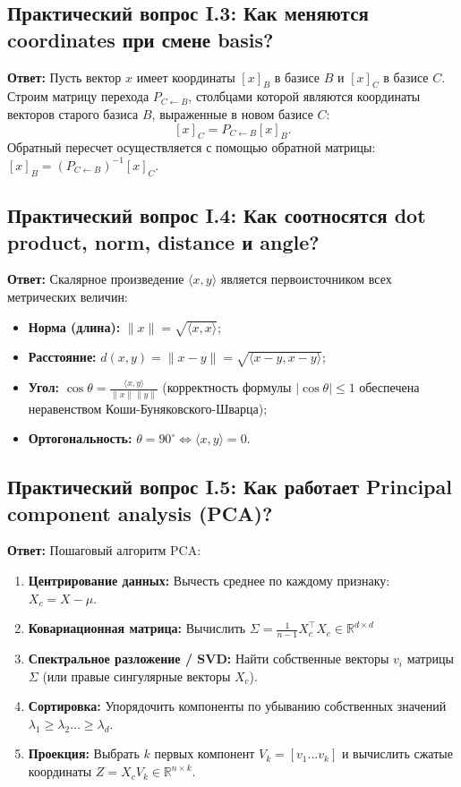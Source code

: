 \subsection{Практический вопрос I.3: Как меняются coordinates при смене basis?}
\textbf{Ответ:} Пусть вектор $x$ имеет координаты $[x]_B$ в базисе $B$ и $[x]_C$ в базисе $C$.
Строим матрицу перехода $P_{C \leftarrow B}$, столбцами которой являются координаты векторов старого базиса $B$,
выраженные в новом базисе $C$:
\[ [x]_C = P_{C \leftarrow B} [x]_B. \]
Обратный пересчет осуществляется с помощью обратной матрицы: $[x]_B = (P_{C \leftarrow B})^{-1} [x]_C$.

\subsection{Практический вопрос I.4: Как соотносятся dot product, norm, distance и angle?}
\textbf{Ответ:} Скалярное произведение $\langle x, y \rangle$ является первоисточником всех метрических величин:
\begin{itemize}
    \item \textbf{Норма (длина):} $\|x\| = \sqrt{\langle x, x \rangle}$;
    \item \textbf{Расстояние:} $d(x, y) = \|x - y\| = \sqrt{\langle x-y, x-y \rangle}$;
    \item \textbf{Угол:} $\cos \theta = \frac{\langle x, y \rangle}{\|x\| \|y\|}$ (корректность формулы
    $|\cos \theta| \le 1$ обеспечена неравенством Коши-Буняковского-Шварца);
    \item \textbf{Ортогональность:} $\theta = 90^\circ \iff \langle x, y \rangle = 0$.
\end{itemize}

\subsection{Практический вопрос I.5: Как работает Principal component analysis (PCA)?}
\textbf{Ответ:} Пошаговый алгоритм PCA:
\begin{enumerate}
    \item \textbf{Центрирование данных:} Вычесть среднее по каждому признаку: $X_c = X - \mu$.
    \item \textbf{Ковариационная матрица:} Вычислить $\Sigma=\frac{1}{n-1} X_c^\top X_c \in \mathbb{R}^{d \times d}$
    \item \textbf{Спектральное разложение / SVD:} Найти собственные векторы $v_i$ матрицы $\Sigma$
    (или правые сингулярные векторы $X_c$).
    \item \textbf{Сортировка:} Упорядочить компоненты по убыванию собственных значений $\lambda_1 \ge \lambda_2
    \dots \ge \lambda_d$.
    \item \textbf{Проекция:} Выбрать $k$ первых компонент $V_k = [v_1 \dots v_k]$ и вычислить сжатые координаты
    $Z = X_c V_k \in \mathbb{R}^{n \times k}$.
\end{enumerate}

